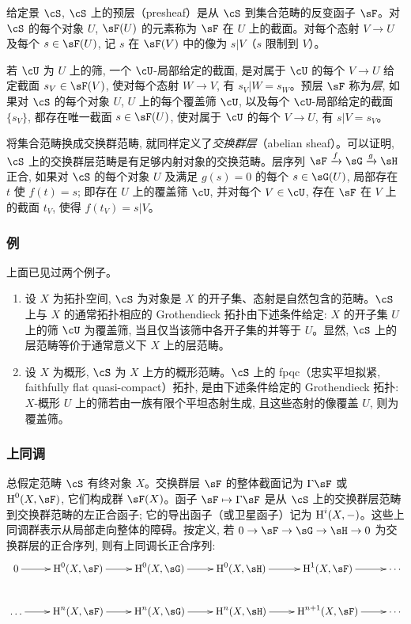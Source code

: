 给定景 $\cS$, $\cS$ 上的预层（presheaf）是从 $\cS$ 到集合范畴的反变函子 $\sF$。对 $\cS$ 的每个对象 $U$, $\sF(U)$ 的元素称为 $\sF$ 在 $U$ 上的截面。对每个态射 $V\to U$ 及每个 $s\in\sF(U)$, 记 $s$ 在 $\sF(V)$ 中的像为 $s|V$（$s$ 限制到 $V$）。

若 $\cU$ 为 $U$ 上的筛, 一个 $\cU$-局部给定的截面, 是对属于 $\cU$ 的每个 $V\to U$ 给定截面 $s_V\in\sF(V)$, 使对每个态射 $W\to V$, 有 $s_V|W=s_W$。预层 $\sF$ 称为\emph{层}, 如果对 $\cS$ 的每个对象 $U$, $U$ 上的每个覆盖筛 $\cU$, 以及每个 $\cU$-局部给定的截面 $\{s_V\}$, 都存在唯一截面 $s\in\sF(U)$, 使对属于 $\cU$ 的每个 $V\to U$, 有 $s|V=s_V$。

将集合范畴换成交换群范畴, 就同样定义了\emph{交换群层}（abelian sheaf）。可以证明, $\cS$ 上的交换群层范畴是有足够内射对象的交换范畴。层序列 $\sF\xrightarrow f\sG\xrightarrow g\sH$ 正合, 如果对 $\cS$ 的每个对象 $U$ 及满足 $g(s)=0$ 的每个 $s\in\sG(U)$, 局部存在 $t$ 使 $f(t)=s$; 即存在 $U$ 上的覆盖筛 $\cU$, 并对每个 $V\in\cU$, 存在 $\sF$ 在 $V$ 上的截面 $t_V$, 使得 $f(t_V)=s|V$。

\subsubsection{例}\label{I:1-6-4}

上面已见过两个例子。

\begin{enumerate}[\indent a)]
  \item 设 $X$ 为拓扑空间, $\cS$ 为对象是 $X$ 的开子集、态射是自然包含的范畴。$\cS$ 上与 $X$ 的通常拓扑相应的 Grothendieck 拓扑由下述条件给定: $X$ 的开子集 $U$ 上的筛 $\cU$ 为覆盖筛, 当且仅当该筛中各开子集的并等于 $U$。显然, $\cS$ 上的层范畴等价于通常意义下 $X$ 上的层范畴。
  \item 设 $X$ 为概形, $\cS$ 为 $X$ 上方的概形范畴。$\cS$ 上的 fpqc（忠实平坦拟紧, faithfully flat quasi-compact）拓扑, 是由下述条件给定的 Grothendieck 拓扑: $X$-概形 $U$ 上的筛若由一族有限个平坦态射生成, 且这些态射的像覆盖 $U$, 则为覆盖筛。
\end{enumerate}

\subsubsection{上同调}\label{I:1-6-5}

总假定范畴 $\cS$ 有终对象 $X$。交换群层 $\sF$ 的整体截面记为 $\Gamma\sF$ 或 $\h^0(X,\sF)$, 它们构成群 $\sF(X)$。函子 $\sF\mapsto\Gamma\sF$ 是从 $\cS$ 上的交换群层范畴到交换群范畴的左正合函子; 它的导出函子（或卫星函子）记为 $\operatorname{H}^i(X,-)$。这些上同调群表示从局部走向整体的障碍。按定义, 若 $0\to\sF\to\sG\to\sH\to0$ 为交换群层的正合序列, 则有上同调长正合序列:
\[\xymatrix{
  0 \ar[r]
    & \h^0(X,\sF) \ar[r]
    & \h^0(X,\sG) \ar[r]
    & \h^0(X,\sH) \ar[r]
    & \h^1(X,\sF) \ar[r]
    & \cdots \\
  \ldots \ar[r]
    & \h^n(X,\sF) \ar[r]
    & \h^n(X,\sG) \ar[r]
    & \h^n(X,\sH) \ar[r]
    & \h^{n+1}(X,\sF) \ar[r]
    & \cdots
}\]

